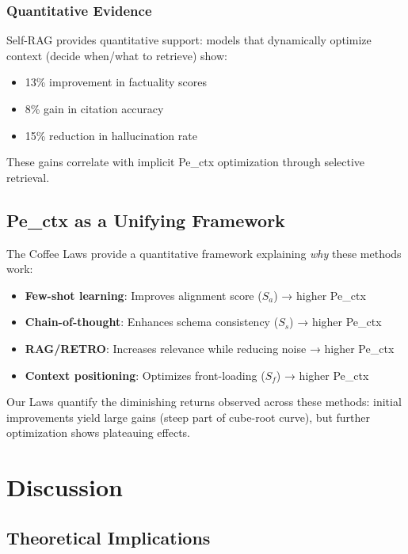 \documentclass[conference]{IEEEtran}
\begin{document}
\subsubsection{Quantitative Evidence}

Self-RAG \cite{asai2023selfrag} provides quantitative support: models that dynamically optimize context (decide when/what to retrieve) show:
\begin{itemize}
\item 13\% improvement in factuality scores
\item 8\% gain in citation accuracy
\item 15\% reduction in hallucination rate
\end{itemize}

These gains correlate with implicit Pe\_ctx optimization through selective retrieval.

\subsection{Pe\_ctx as a Unifying Framework}

The Coffee Laws provide a quantitative framework explaining \textit{why} these methods work:

\begin{itemize}
\item \textbf{Few-shot learning}: Improves alignment score ($S_a$) → higher Pe\_ctx
\item \textbf{Chain-of-thought}: Enhances schema consistency ($S_s$) → higher Pe\_ctx
\item \textbf{RAG/RETRO}: Increases relevance while reducing noise → higher Pe\_ctx
\item \textbf{Context positioning}: Optimizes front-loading ($S_f$) → higher Pe\_ctx
\end{itemize}

Our Laws quantify the diminishing returns observed across these methods: initial improvements yield large gains (steep part of cube-root curve), but further optimization shows plateauing effects.

\section{Discussion}

\subsection{Theoretical Implications}
\end{document}
